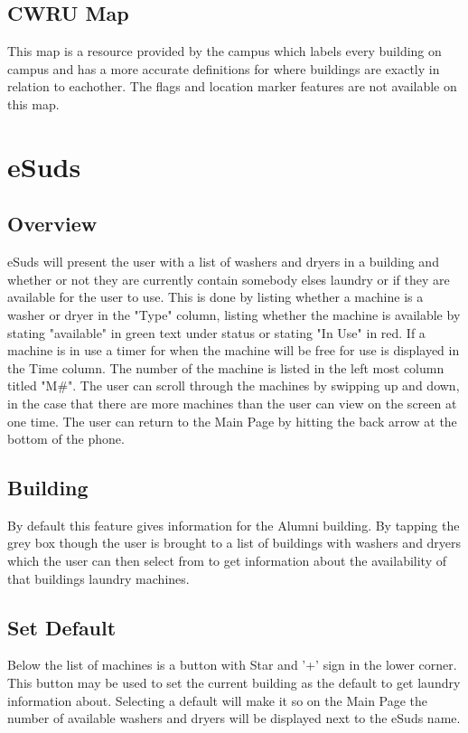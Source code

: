 \documentclass[pdftex,12pt,letter]{article}
\begin{document}
\subsection{CWRU Map}
This map is a resource provided by the campus which labels every building on campus and has a more accurate definitions for where buildings are exactly in relation to eachother. The flags and location marker features are not available on this map.

\section{eSuds}
\subsection{Overview}
eSuds will present the user with a list of washers and dryers in a building and whether or not they are currently contain somebody elses laundry or if they are available for the user to use. This is done by listing whether a machine is a washer or dryer in the "Type" column, listing whether the machine is available by stating "available" in green text under status or stating "In Use" in red. If a machine is in use a timer for when the machine will be free for use is displayed in the Time column. The number of the machine is listed in the left most column titled "M\#". The user can scroll through the machines by swipping up and down, in the case that there are more machines than the user can view on the screen at one time. The user can return to the Main Page by hitting the back arrow at the bottom of the phone.
\subsection{Building}
By default this feature gives information for the Alumni building. By tapping the grey box though the user is brought to a list of buildings with washers and dryers which the user can then select from to get information about the availability of that buildings laundry machines. 
\subsection{Set Default}
Below the list of machines is a button with Star and '+' sign in the lower corner. This button may be used to set the current building as the default to get laundry information about. Selecting a default will make it so on the Main Page the number of available washers and dryers will be displayed next to the eSuds name.
\end{document}
